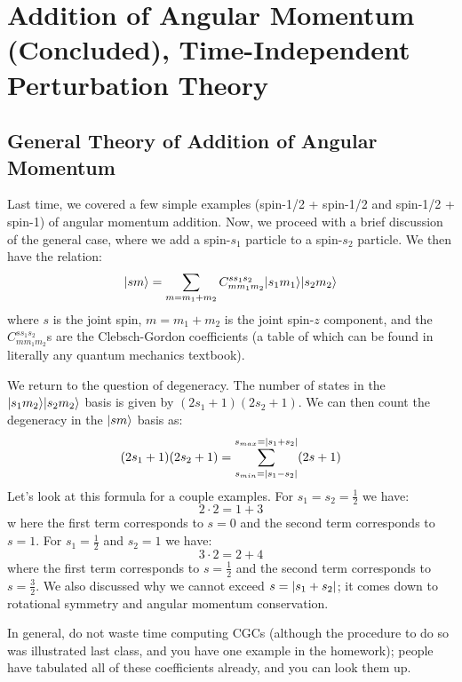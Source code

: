 \section{Addition of Angular Momentum (Concluded), Time-Independent Perturbation Theory}

\subsection{General Theory of Addition of Angular Momentum}
Last time, we covered a few simple examples (spin-1/2 + spin-1/2 and spin-1/2 + spin-1) of angular momentum addition. Now, we proceed with a brief discussion of the general case, where we add a spin-$s_1$ particle to a spin-$s_2$ particle. We then have the relation:
\begin{equation}
    \lvert s m \rangle = \sum_{m = m_1 + m_2} C_{m m_1 m_2}^{s s_1 s_2}\lvert s_1m_1 \rangle\lvert s_2m_2 \rangle
\end{equation}
where $s$ is the joint spin, $m = m_1 + m_2$ is the joint spin-$z$ component, and the $C_{m m_1 m_2}^{s s_1 s_2}$s are the Clebsch-Gordon coefficients (a table of which can be found in literally any quantum mechanics textbook). 

We return to the question of degeneracy. The number of states in the $\lvert s_1m_2 \rangle\lvert s_2m_2 \rangle$ basis is given by $(2s_1 + 1)(2s_2 + 1)$. We can then count the degeneracy in the $\lvert sm \rangle$ basis as:
\begin{equation}
    (2s_1 + 1)(2s_2 + 1) = \sum_{s_{min} = \lvert s_1 - s_2 \rvert}^{s_{max} = \lvert s_1 + s_2 \rvert}(2s+1)
\end{equation}
Let's look at this formula for a couple examples. For $s_1 = s_2 = \frac{1}{2}$ we have:
\begin{equation}
    2 \cdot 2 = 1 + 3
\end{equation}
w here the first term corresponds to $s = 0$ and the second term corresponds to $s = 1$. For $s_1 = \frac{1}{2}$ and $s_2 = 1$ we have:
\begin{equation}
    3 \cdot 2 = 2 + 4
\end{equation}
where the first term corresponds to $s = \frac{1}{2}$ and the second term corresponds to $s = \frac{3}{2}$. We also discussed why we cannot exceed $s = \lvert s_1 + s_2 \rvert$; it comes down to rotational symmetry and angular momentum conservation.

In general, do not waste time computing CGCs (although the procedure to do so was illustrated last class, and you have one example in the homework); people have tabulated all of these coefficients already, and you can look them up.

